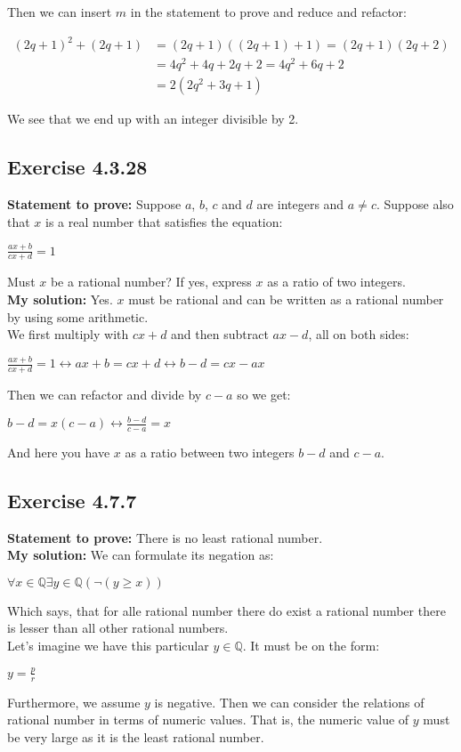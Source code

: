 \documentclass{report}
\newcommand{\cent}[1]{\begin{center}#1\end{center}}
\newcommand{\mAlign}[1]{\begin{align*}#1\end{align*}}
\newcommand{\doubleQ}{\mathbb{Q}}
\newcommand{\In}{\! \in \!}
\newcommand{\Prove}{\textbf{Statement to prove: }}
\newcommand{\solution}{\textbf{My solution: }}
\newcommand{\QED}{\boxed{}}
\newcommand{\Exercise}[1]{\subsection{Exercise #1}}
\begin{document}
	Then we can insert $m$ in the statement to prove and reduce and refactor:
	
	\mAlign{(2q+1)^2 + (2q+1) &= (2q+1)((2q+1) + 1) = (2q+1)(2q+2) \\
					&= 4q^2 +4q + 2q +2 = 4q^2 +6q + 2 \\
					&= 2(2q^2+3q + 1)}
				
	We see that we end up with an integer divisible by 2.\\
	\QED
	
	\Exercise{4.3.28}
	
	\Prove
	Suppose $a$, $b$, $c$ and $d$ are integers and $a \neq c$. Suppose also that $x$ is a real number that satisfies the equation:
	
	\cent{$\frac{ax+b}{cx+d} = 1$}
	
	Must $x$ be a rational number? If yes, express $x$ as a ratio of two integers.\\
	
	\solution
	Yes. $x$ must be rational and can be written as a rational number by using some arithmetic.\\
	
	We first multiply with $cx+d$ and then subtract $ax - d$, all on both sides:
	 
	\cent{$\frac{ax+b}{cx+d} = 1 \leftrightarrow ax+b = cx+d \leftrightarrow b - d = cx - ax$}
	
	Then we can refactor and divide by $c-a$ so we get:
	
	\cent{$b -d = x(c-a) \leftrightarrow \frac{b-d}{c-a} = x$}
	
	And here you have $x$ as a ratio between two integers $b-d$ and $c-a$.\\
	\QED
	
	\Exercise{4.7.7}
	
	\Prove
	There is no least rational number.\\
	
	\solution
	We can formulate its negation as:
	
	\cent{$\forall x \In \doubleQ \exists y \in \doubleQ(\neg(y \geq x))$}
	
	Which says, that for alle rational number there do exist a rational number there is lesser than all other rational numbers.\\
	
	Let's imagine we have this particular $y \in \doubleQ$.  It must be on the form:
	
	\cent{$y = \frac{p}{r}$}
	
	Furthermore, we assume $y$ is negative. Then we can consider the relations of rational number in terms of numeric values. That is, the numeric value of $y$ must be very large as it is the least rational number. \\
	
\end{document}
